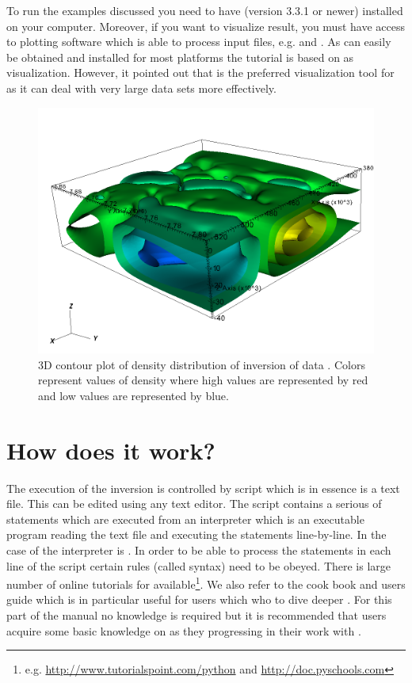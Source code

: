 To run the examples discussed you need to have \escript (version 3.3.1 or newer) installed on your computer.
Moreover, if you want to visualize result, you must have access to plotting software which is able to process
\VTK input files, e.g. \mayavi and \VisIt. As \mayavi can easily be obtained and installed for most platforms
the tutorial is based on \mayavi as visualization. However, it pointed out 
that \VisIt is the preferred visualization tool for \escript as it can deal with very large data sets more effectively.
    


\begin{figure}
\centering
\includegraphics[width=\textwidth]{density10.png}
\caption{3D contour plot of density distribution of inversion of data . Colors
represent values of density where high values are represented by red and low values are represented by blue.}
\label{FIG:P1:GRAV:1}
\end{figure}

\section{How does it work?}
The execution of the inversion is controlled by script which is in essence is a text file. This can be edited using any 
text editor. The script contains a serious of statements which are executed from an interpreter which
is an executable program reading the text file and executing the statements line-by-line. In the case 
of \downunder the interpreter is \python. In order to be able to process the statements in each line of the script
certain rules (called syntax) need to be obeyed. There is large number of online tutorials for \python 
available\footnote{e.g. \url{http://www.tutorialspoint.com/python} and \url{http://doc.pyschools.com}}. We also 
refer to the \escript cook book \cite{ESCRIPTCOOKBOOK} and users guide \cite{ESCRIPT} which is in particular useful for users which who to dive deeper
\downunder. For this part of the manual no \python knowledge is required but it is recommended that 
users acquire some basic knowledge on \python as they progressing in their work with \downunder.

